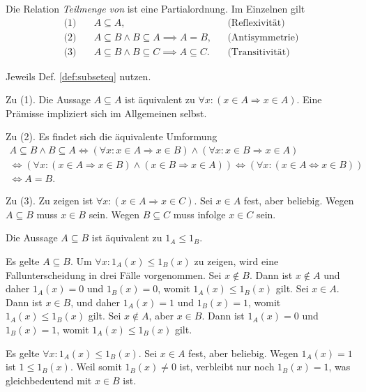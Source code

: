 \newpage
\begin{Satz}
Die Relation \emph{Teilmenge von} ist eine Partialordnung.
Im Einzelnen gilt%
\begin{align*}
\text{(1)}\quad & A\subseteq A, && \text{(Reflexivität)}\\
\text{(2)}\quad & A\subseteq B\land B\subseteq A \implies A = B, && \text{(Antisymmetrie)}\\
\text{(3)}\quad & A\subseteq B\land B\subseteq C \implies A\subseteq C. && \text{(Transitivität)}
\end{align*}
\end{Satz}
\begin{Beweis}
Jeweils Def. \ref{def:subseteq} nutzen.

Zu (1). Die Aussage $A\subseteq A$ ist 
äquivalent zu $\forall x\colon (x\in A\Rightarrow x\in A)$.
Eine Prämisse impliziert sich im Allgemeinen selbst.

Zu (2). Es findet sich die äquivalente Umformung
\begin{gather*}
A\subseteq B\land B\subseteq A\iff
(\forall x\colon x\in A\Rightarrow x\in B)
\land (\forall x\colon x\in B\Rightarrow x\in A)\\
\iff (\forall x\colon (x\in A\Rightarrow x\in B)\land (x\in B\Rightarrow x\in A))
\iff (\forall x\colon (x\in A\Leftrightarrow x\in B))\\
\iff A = B.
\end{gather*}

Zu (3). Zu zeigen ist $\forall x\colon (x\in A\Rightarrow x\in C)$.
Sei $x\in A$ fest, aber beliebig. Wegen $A\subseteq B$ muss $x\in B$
sein. Wegen $B\subseteq C$ muss infolge $x\in C$ sein.\,\qedsymbol
\end{Beweis}

\begin{Satz}
Die Aussage $A\subseteq B$ ist äquivalent zu $1_A\le 1_B$.
\end{Satz}
\begin{Beweis}
Es gelte $A\subseteq B$. Um $\forall x\colon 1_A(x)\le 1_B(x)$ zu
zeigen, wird eine Fallunterscheidung in drei Fälle vorgenommen.
Sei $x\notin B$. Dann ist $x\notin A$
und daher $1_A(x)=0$ und $1_B(x)=0$, womit $1_A(x)\le 1_B(x)$ gilt.
Sei $x\in A$. Dann ist $x\in B$, und daher $1_A(x)=1$ und $1_B(x)=1$,
womit $1_A(x)\le 1_B(x)$ gilt.
Sei $x\notin A$, aber $x\in B$. Dann ist $1_A(x)=0$ und $1_B(x)=1$,
womit $1_A(x)\le 1_B(x)$ gilt.

Es gelte $\forall x\colon 1_A(x)\le 1_B(x)$. Sei $x\in A$ fest,
aber beliebig. Wegen $1_A(x)=1$ ist $1\le 1_B(x)$. Weil somit
$1_B(x)\ne 0$ ist, verbleibt nur noch $1_B(x)=1$, was
gleichbedeutend mit $x\in B$ ist.\,\qedsymbol
\end{Beweis}

